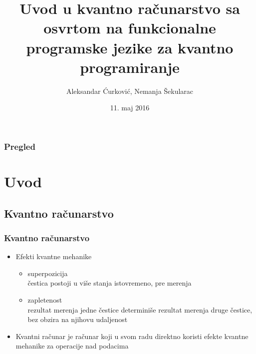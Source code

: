 \documentclass[12pt,hyperref={unicode}]{beamer}
\title[Short title]{Uvod u kvantno računarstvo sa osvrtom na funkcionalne programske jezike za kvantno programiranje} %
\author{Aleksandar Ćurković, Nemanja Šekularac} %
\institute %
{
Matematički fakultet \\ %
\medskip
\textit{nsekularac@gmail.com, curkovical@gmail.com} %
}
\date{11. maj 2016} %
\begin{document}
\begin{frame}
\titlepage %
\end{frame}

\begin{frame}
\frametitle{Pregled} %
\tableofcontents %
\end{frame}


\section{Uvod} %

\subsection{Kvantno računarstvo}%


\begin{frame}
\frametitle{Kvantno računarstvo}
\begin{itemize}

\item{Efekti kvantne mehanike}
	\begin{itemize}
    \item{superpozicija}\\
	čestica postoji u više stanja istovremeno, pre merenja
    \item{zapletenost}\\
	rezultat merenja jedne čestice determiniše rezultat merenja druge čestice, bez obzira na njihovu udaljenost
    \end{itemize}
\item{Kvantni računar je računar koji u svom radu direktno koristi efekte kvantne mehanike za operacije nad podacima}
\end{itemize}

\end{frame}
\end{document}

